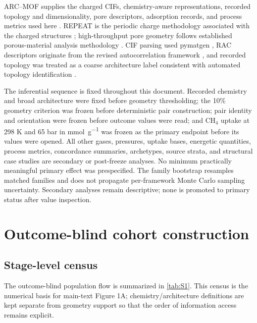\documentclass[11pt,a4paper]{article}
\begin{document}
ARC--MOF supplies the charged CIFs, chemistry-aware representations, recorded
topology and dimensionality, pore descriptors, adsorption records, and process
metrics used here \cite{burner2023arcmof}. REPEAT is the periodic charge
methodology associated with the charged structures \cite{campana2009repeat};
high-throughput pore geometry follows established porous-material analysis
methodology \cite{willems2012zeopp}. CIF parsing used pymatgen
\cite{ong2013pymatgen}, RAC descriptors originate from the revised autocorrelation
framework \cite{janet2017rac}, and recorded topology was treated as a coarse
architecture label consistent with automated topology identification
\cite{zoubritzky2022crystalnets}.

The inferential sequence is fixed throughout this document. Recorded chemistry and
broad architecture were fixed before geometry thresholding; the 10\% geometry
criterion was frozen before deterministic pair construction; pair identity and
orientation were frozen before outcome values were read; and CH$_4$ uptake at
298 K and 65 bar in \si{\milli\mole\per\gram} was frozen as the primary endpoint
before its values were opened. All other gases, pressures, uptake bases, energetic
quantities, process metrics, concordance summaries, archetypes, source strata, and
structural case studies are secondary or post-freeze analyses. No minimum
practically meaningful primary effect was prespecified. The family bootstrap
resamples matched families and does not propagate per-framework Monte Carlo
sampling uncertainty. Secondary analyses remain descriptive; none is promoted to
primary status after value inspection.


\section{Outcome-blind cohort construction}
\label{sec:cohort}

\subsection{Stage-level census}

The outcome-blind population flow is summarized in \cref{tab:S1}. This census is the numerical basis for main-text Figure 1A; chemistry/architecture definitions are kept separate from geometry support so that the order of information access remains explicit.
\end{document}

